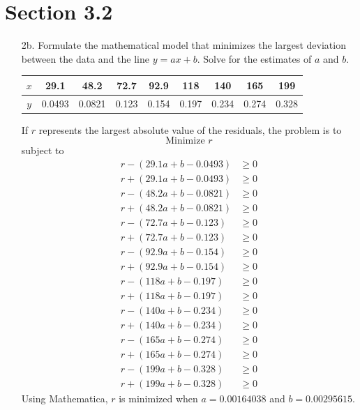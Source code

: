 \documentclass[10pt]{report}
\begin{document}
\section*{Section 3.2}
\begin{enumerate}
	\item [2b.]
	Formulate the mathematical model that minimizes the largest deviation between the data and the line $y=ax+b$. Solve for the estimates of $a$ and $b$.
	\begin{table}[H]
		\centering
		\begin{tabular}{*{9}{c}} 
			\toprule
			$x$ & 29.1 & 48.2 & 72.7 & 92.9 & 118 & 140 & 165 & 199\\ \midrule
			$y$ & 0.0493 & 0.0821 & 0.123 & 0.154 & 0.197 & 0.234 & 0.274 & 0.328 \\
			\bottomrule
		\end{tabular}
	\end{table}
	If $r$ represents the largest absolute value of the residuals, the problem is to
	\[
	\text{Minimize } r
	\]
	subject to
	\begin{align*}
		r - (29.1a + b - 0.0493) &\ge 0\\
		r + (29.1a + b - 0.0493) &\ge 0\\
		r - (48.2 a + b - 0.0821) &\ge 0\\
		r + (48.2 a + b - 0.0821) &\ge 0\\
		r - (72.7 a + b - 0.123) &\ge 0\\
		r + (72.7 a + b - 0.123) &\ge 0\\
		r - (92.9 a + b - 0.154) &\ge 0\\
		r + (92.9 a + b - 0.154) &\ge 0\\
		r - (118 a + b - 0.197) &\ge 0\\
		r + (118 a + b - 0.197) &\ge 0\\
		r - (140 a + b - 0.234) &\ge 0\\
		r + (140 a + b - 0.234) &\ge 0\\
		r - (165 a + b - 0.274) &\ge 0\\
		r + (165 a + b - 0.274) &\ge 0 \\
		r - (199 a + b - 0.328) &\ge 0 \\
		r + (199 a + b - 0.328) &\ge 0
	\end{align*}
	Using Mathematica, $r$ is minimized when $a=0.00164038$ and $b=0.00295615$.
	

\end{enumerate}
\end{document}
